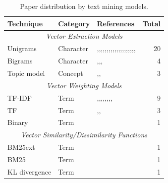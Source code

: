 \begin{table}[h!]
  \centering
  \captionsetup{type=table}
  \caption{Paper distribution by text mining models.}
  \small
  \begin{tabular}{@{}llp{10cm}r@{}}
    \toprule
    \textbf{Technique} & \textbf{Category} & \textbf{References} & \textbf{Total} \\
    \midrule
    \multicolumn{4}{c}{ \textit{Vector Extraction Models} } \\
    \midrule
    Unigrams & Character & \cite{Lamkanfi:2010},\cite{Lamkanfi:2011},\cite{Tian:2012},\cite{Yang:2012},\cite{Chaturvedi:2012},\cite{Yang:2014b},\cite{Yang:2014a},\cite{Roy:2014},\cite{Sharma:2015},\cite{Gujral:2015},\cite{Otoom:2016},\cite{Sabor:2016},\cite{Tian:2016},\cite{Zhang:2016},\cite{Jin:2016a},\cite{Choeikiwong:2016},\cite{Jin:2016b},\cite{Jin:2016c},\cite{Yang:2017},\cite{Singh:2017},\cite{Roy:2017} & 20 \\
    \midrule
    Bigrams & Character & \cite{Tian:2012},\cite{Roy:2014},\cite{Tian:2016},\cite{Zhang:2016} & 4 \\
    \midrule
    Topic model\footnotemark & Concept & \cite{Yang:2014b},\cite{Zhang:2015},\cite{Zhang:2016} & 3 \\
    \midrule
    \multicolumn{4}{c}{ \textit{Vector Weighting Models} } \\
    \midrule
    TF-IDF & Term & \cite{Lamkanfi:2011},\cite{Chaturvedi:2012},\cite{Roy:2014},\cite{Zhang:2015},\cite{Sharma:2015},\cite{Gujral:2015},\cite{Sabor:2016},\cite{Singh:2017},\cite{Roy:2017} & 9 \\
    \midrule
    TF & Term & \cite{Lamkanfi:2011},\cite{Yang:2012},\cite{Otoom:2016} & 3 \\
    \midrule
    Binary & Term & \cite{Lamkanfi:2011} & 1 \\
    \midrule
    \multicolumn{4}{c}{ \textit{Vector Similarity/Dissimilarity Functions} } \\
    \midrule
    BM25ext\footnotemark & Term & \cite{Zhang:2016} & 1 \\
    \midrule
    BM25 & Term & \cite{Tian:2012} & 1 \\
    KL divergence\footnotemark & Term & \cite{Yang:2014b} & 1 \\
    \bottomrule
  \end{tabular}
  \label{tab:papers_by_tm_models}
\end{table}

